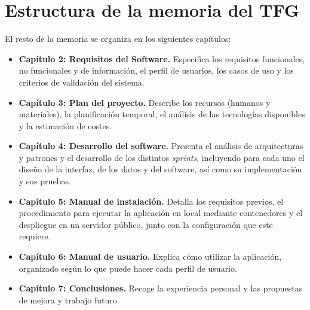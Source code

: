 \section{Estructura de la memoria del TFG}

El resto de la memoria se organiza en los siguientes capítulos:

\begin{itemize}
	\item \textbf{Capítulo 2: Requisitos del Software.} Especifica los requisitos funcionales,
		no funcionales y de información, el perfil de usuarios, los casos de uso y los criterios
		de validación del sistema.
	\item \textbf{Capítulo 3: Plan del proyecto.} Describe los recursos (humanos y materiales),
		la planificación temporal, el análisis de las tecnologías disponibles y la estimación de
		costes.
	\item \textbf{Capítulo 4: Desarrollo del software.} Presenta el análisis de arquitecturas y
		patrones y el desarrollo de los distintos \textit{sprints}, incluyendo para cada uno el
		diseño de la interfaz, de los datos y del software, así como su implementación y sus pruebas.
	\item \textbf{Capítulo 5: Manual de instalación.} Detalla los requisitos previos, el
		procedimiento para ejecutar la aplicación en local mediante contenedores y el despliegue en
		un servidor público, junto con la configuración que este requiere.
	\item \textbf{Capítulo 6: Manual de usuario.} Explica cómo utilizar la aplicación, organizado
		según lo que puede hacer cada perfil de usuario.
	\item \textbf{Capítulo 7: Conclusiones.} Recoge la experiencia personal y las propuestas de
		mejora y trabajo futuro.
\end{itemize}
